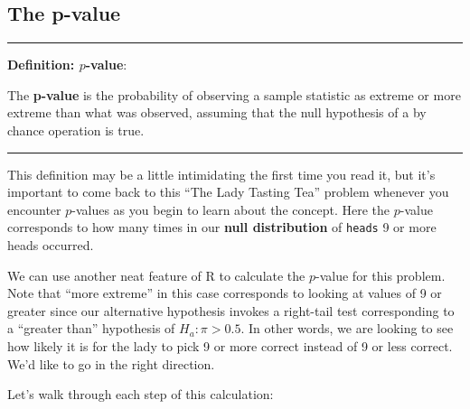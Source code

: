 \documentclass[]{tufte-book}
\newenvironment{Shaded}{\begin{snugshade}}{\end{snugshade}}
\newcommand{\KeywordTok}[1]{\textcolor[rgb]{0.13,0.29,0.53}{\textbf{{#1}}}}
\newcommand{\DecValTok}[1]{\textcolor[rgb]{0.00,0.00,0.81}{{#1}}}
\newcommand{\StringTok}[1]{\textcolor[rgb]{0.31,0.60,0.02}{{#1}}}
\newcommand{\NormalTok}[1]{{#1}}
\let\oldrule=\rule
\renewcommand{\rule}[1]{\oldrule{\linewidth}}
\begin{document}
\subsection{The p-value}\label{the-p-value}

\begin{center}\rule{0.5\linewidth}{\linethickness}\end{center}

\textbf{Definition: \(p\)-value}:

The \textbf{p-value} is the probability of observing a sample statistic
as extreme or more extreme than what was observed, assuming that the
null hypothesis of a by chance operation is true.

\begin{center}\rule{0.5\linewidth}{\linethickness}\end{center}

This definition may be a little intimidating the first time you read it,
but it's important to come back to this ``The Lady Tasting Tea'' problem
whenever you encounter \(p\)-values as you begin to learn about the
concept. Here the \(p\)-value corresponds to how many times in our
\textbf{null distribution} of \texttt{heads} 9 or more heads occurred.

We can use another neat feature of R to calculate the \(p\)-value for
this problem. Note that ``more extreme'' in this case corresponds to
looking at values of 9 or greater since our alternative hypothesis
invokes a right-tail test corresponding to a ``greater than'' hypothesis
of \(H_a: \pi > 0.5\). In other words, we are looking to see how likely
it is for the lady to pick 9 or more correct instead of 9 or less
correct. We'd like to go in the right direction.

\begin{Shaded}
\end{Shaded}

Let's walk through each step of this calculation:
\end{document}
